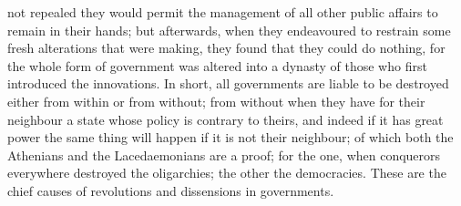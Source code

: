 not repealed they would permit the management of all other public affairs
to remain in their hands; but afterwards, when they endeavoured to
restrain some fresh alterations that were making, they found that they
could do nothing, for the whole form of government was altered into a
dynasty of those who first introduced the innovations. In short, all
governments are liable to be destroyed either from within or from without;
from without when they have for their neighbour a state whose policy is
contrary to theirs, and indeed if it has great power the same thing will
happen if it is not their neighbour; of which both the Athenians and the
Lacedaemonians are a proof; for the one, when conquerors everywhere
destroyed the oligarchies; the other the democracies. These are the chief
causes of revolutions and dissensions in governments.


